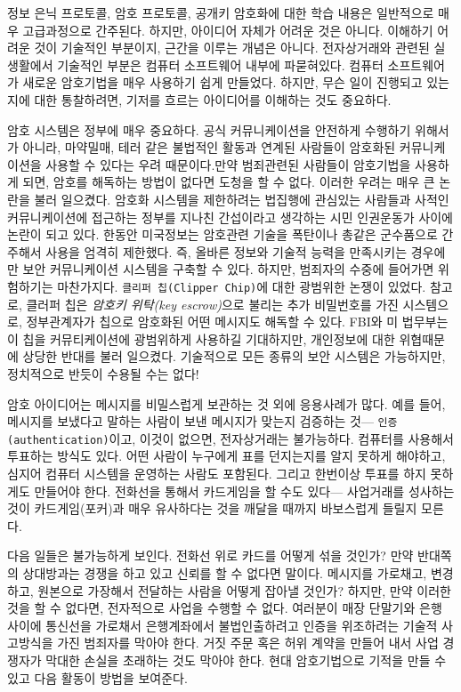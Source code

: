 \documentclass[]{article}
\begin{document}
정보 은닉 프로토콜, 암호 프로토콜, 공개키 암호화에 대한 학습 내용은
일반적으로 매우 고급과정으로 간주된다. 하지만, 아이디어 자체가 어려운
것은 아니다. 이해하기 어려운 것이 기술적인 부분이지, 근간을 이루는
개념은 아니다. 전자상거래와 관련된 실생활에서 기술적인 부분은 컴퓨터
소프트웨어 내부에 파묻혀있다. 컴퓨터 소프트웨어가 새로운 암호기법을 매우
사용하기 쉽게 만들었다. 하지만, 무슨 일이 진행되고 있는지에 대한
통찰하려면, 기저를 흐르는 아이디어를 이해하는 것도 중요하다.

암호 시스템은 정부에 매우 중요하다. 공식 커뮤니케이션을 안전하게
수행하기 위해서가 아니라, 마약밀매, 테러 같은 불법적인 활동과 연계된
사람들이 암호화된 커뮤니케이션을 사용할 수 있다는 우려 때문이다.만약
범죄관련된 사람들이 암호기법을 사용하게 되면, 암호를 해독하는 방법이
없다면 도청을 할 수 없다. 이러한 우려는 매우 큰 논란을 불러 일으켰다.
암호화 시스템을 제한하려는 법집행에 관심있는 사람들과 사적인
커뮤니케이션에 접근하는 정부를 지나친 간섭이라고 생각하는 시민
인권운동가 사이에 논란이 되고 있다. 한동안 미국정보는 암호관련 기술을
폭탄이나 총같은 군수품으로 간주해서 사용을 엄격히 제한했다. 즉, 올바른
정보와 기술적 능력을 만족시키는 경우에만 보안 커뮤니케이션 시스템을
구축할 수 있다. 하지만, 범죄자의 수중에 들어가면 위험하기는 마찬가지다.
\texttt{클리퍼 칩(Clipper Chip)}에 대한 광범위한 논쟁이 있었다. 참고로,
클러퍼 칩은 \emph{암호키 위탁(key escrow)}으로 불리는 추가 비밀번호를
가진 시스템으로, 정부관계자가 칩으로 암호화된 어떤 메시지도 해독할 수
있다. FBI와 미 법무부는 이 칩을 커뮤티케이션에 광범위하게 사용하길
기대하지만, 개인정보에 대한 위협때문에 상당한 반대를 불러 일으켰다.
기술적으로 모든 종류의 보안 시스템은 가능하지만, 정치적으로 반듯이
수용될 수는 없다!

암호 아이디어는 메시지를 비밀스럽게 보관하는 것 외에 응용사례가 많다.
예를 들어, 메시지를 보냈다고 말하는 사람이 보낸 메시지가 맞는지 검증하는
것--- \texttt{인증(authentication)}이고, 이것이 없으면, 전자상거래는
불가능하다. 컴퓨터를 사용해서 투표하는 방식도 있다. 어떤 사람이 누구에게
표를 던지는지를 알지 못하게 해야하고, 심지어 컴퓨터 시스템을 운영하는
사람도 포함된다. 그리고 한번이상 투표를 하지 못하게도 만들어야 한다.
전화선을 통해서 카드게임을 할 수도 있다--- 사업거래를 성사하는 것이
카드게임(포커)과 매우 유사하다는 것을 깨달을 때까지 바보스럽게 들릴지
모른다.

다음 일들은 불가능하게 보인다. 전화선 위로 카드를 어떻게 섞을 것인가?
만약 반대쪽의 상대방과는 경쟁을 하고 있고 신뢰를 할 수 없다면 말이다.
메시지를 가로채고, 변경하고, 원본으로 가장해서 전달하는 사람을 어떻게
잡아낼 것인가? 하지만, 만약 이러한 것을 할 수 없다면, 전자적으로 사업을
수행할 수 없다. 여러분이 매장 단말기와 은행 사이에 통신선을 가로채서
은행계좌에서 불법인출하려고 인증을 위조하려는 기술적 사고방식을 가진
범죄자를 막아야 한다. 거짓 주문 혹은 허위 계약을 만들어 내서 사업
경쟁자가 막대한 손실을 초래하는 것도 막아야 한다. 현대 암호기법으로
기적을 만들 수 있고 다음 활동이 방법을 보여준다.
\end{document}

